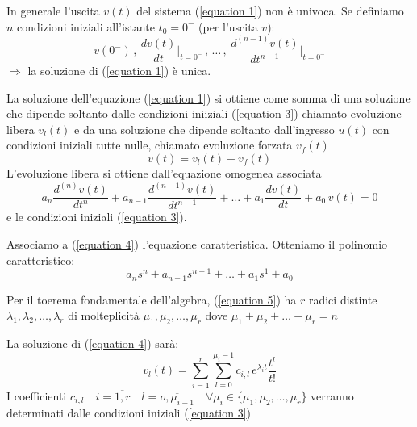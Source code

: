 \begin{osservazione}
	In generale l'uscita $v(t)$ del sistema (\ref{equation 1})
	non è univoca. Se definiamo $n$ condizioni iniziali all'istante $t_0 = 0^-$ (per l'uscita $v$):
	\begin{equation}
		v(0^-) \,
		,\, \frac{dv(t)}{dt}\bigg\vert_{t=0^-} \,
		,\, \dots\,
		,\, \frac{d^{(n-1)}v(t)}{dt^{n-1}}\bigg\vert_{t=0^-}
		\tag{3}\label{equation 3}
	\end{equation}
	$\Rightarrow$ la soluzione di (\ref{equation 1}) è unica.
\end{osservazione}

La soluzione dell'equazione (\ref{equation 1}) si ottiene come somma di una soluzione che dipende soltanto dalle condizioni iniiziali (\ref{equation 3}) chiamato evoluzione libera $v_l(t)$ e da una soluzione che dipende soltanto dall'ingresso $u(t)$ con condizioni iniziali tutte nulle, chiamato evoluzione forzata $v_f(t)$ %
\[
v(t) = v_l(t) + v_f(t)
\]
L'evoluzione libera si ottiene dall'equazione omogenea associata
\begin{equation}
	a_n \frac{d^{(n)} v(t)}{dt^n} 
		+ a_{n-1} \frac{d^{(n-1)} v(t)}{dt^{n-1}} 
		+ \dots 
		+ a_1 \frac{dv(t)}{dt} 
		+ a_0\,v(t)
	= 0
	\tag{4}\label{equation 4}
\end{equation}
e le condizioni iniziali (\ref{equation 3}).

Associamo a (\ref{equation 4}) l'equazione caratteristica. Otteniamo il polinomio caratteristico: %
\begin{equation}
	a_n s^n 
	+ a_{n-1} s^{n-1}
	+ \dots
	+ a_1 s^1
	+ a_0
	\tag{5}\label{equation 5}
\end{equation}

Per il toerema fondamentale dell'algebra, (\ref{equation 5}) ha $r$ radici  distinte $\lambda_1,\lambda_2, \dots, \lambda_r$ di molteplicità $\mu_1, \mu_2, \dots,\mu_r$ dove  $\mu_1 +\mu_2 + \dots + \mu_r = n$

La soluzione di (\ref{equation 4}) sarà:
\begin{equation}
	v_l(t)=  \sum_{i=1}^{r}\sum_{l=0}^{\mu_i-1}c_{i,l} \,e^{\lambda_it}\frac{t^l}{t!}
	\tag{6}\label{equation 6}
\end{equation}
I coefficienti $c_{i,l}
	\quad i=\overline{1,r} 
	\quad l=\overline{o,\mu_{i-1}}
	\quad \forall\mu_i \in \{\mu_1,\mu_2,\dots,\mu_r\} $ 
	verranno determinati dalle condizioni iniziali (\ref{equation 3})
	
